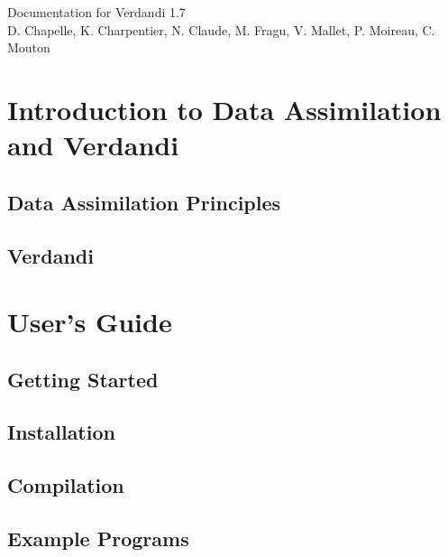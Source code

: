 \documentclass{book}
\begin{document}
\hypersetup{pageanchor=false,citecolor=blue}
\begin{titlepage}
\vspace*{7cm}
\begin{center}
{\Large Documentation for Verdandi 1.7}\\
\vspace*{1cm}
{\large D. Chapelle, K. Charpentier, N. Claude, M. Fragu, V. Mallet, P. Moireau, C. Mouton}\\
\end{center}
\end{titlepage}
\clearemptydoublepage
{}
\tableofcontents
\clearemptydoublepage
{}
\hypersetup{pageanchor=true,citecolor=blue}
\part{Introduction to Data Assimilation and Verdandi}
\chapter{Data Assimilation Principles}

\chapter{Verdandi}
\label{index}\hypertarget{index}{}
\part{User's Guide}
\chapter{Getting Started}
\label{getting_started}
\hypertarget{getting_started}{}

\chapter{Installation}
\label{installation}
\hypertarget{installation}{}

\chapter{Compilation}
\label{compilation}
\hypertarget{compilation}{}

\chapter{Example Programs}
\label{example_programs}
\hypertarget{example_programs}{}

\end{document}
